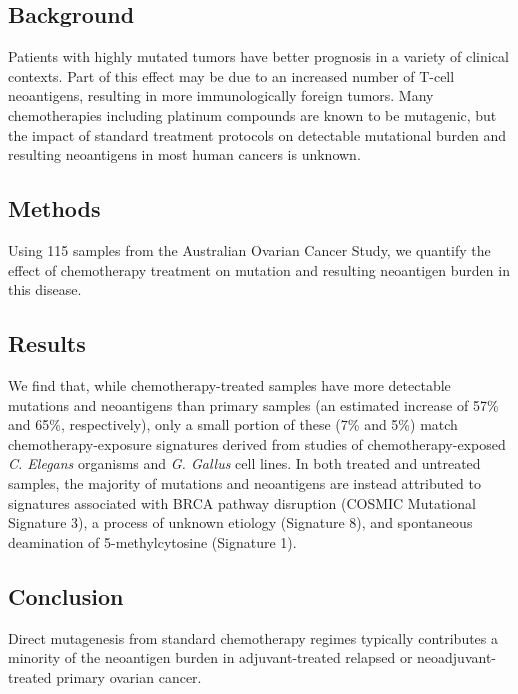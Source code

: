 \subsection*{Background}
Patients with highly mutated tumors have better prognosis in a variety of clinical contexts. Part of this effect may be due to an increased number of T-cell neoantigens, resulting in more immunologically foreign tumors. Many chemotherapies including platinum compounds are known to be mutagenic, but the impact of standard treatment protocols on detectable mutational burden and resulting neoantigens in most human cancers is unknown.

\subsection*{Methods}
Using 115 samples from the Australian Ovarian Cancer Study, we quantify the effect of chemotherapy treatment on mutation and resulting neoantigen burden in this disease.

\subsection*{Results}
We find that, while chemotherapy-treated samples have more detectable mutations and neoantigens than primary samples (an estimated increase of 57\% and 65\%, respectively), only a small portion of these (7\% and 5\%) match chemotherapy-exposure signatures derived from studies of chemotherapy-exposed \textit{C. Elegans} organisms and \textit{G. Gallus} cell lines. In both treated and untreated samples, the majority of mutations and neoantigens are instead attributed to signatures associated with BRCA pathway disruption (COSMIC Mutational Signature 3), a process of unknown etiology (Signature 8), and spontaneous deamination of 5-methylcytosine (Signature 1).

\subsection*{Conclusion}
Direct mutagenesis from standard chemotherapy regimes typically contributes a minority of the neoantigen burden in adjuvant-treated relapsed or neoadjuvant-treated primary ovarian cancer.


